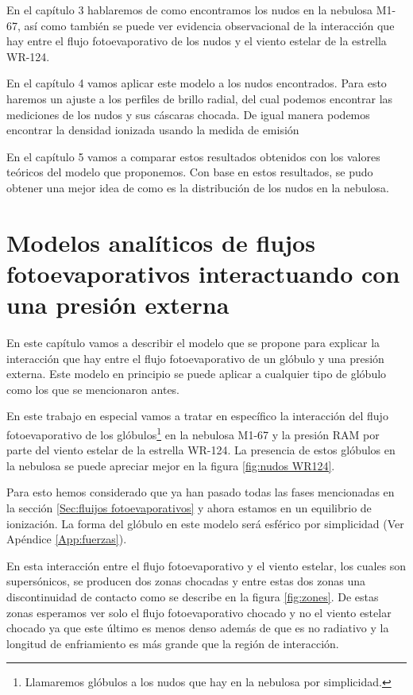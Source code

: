\documentclass{book}
\begin{document}
En el capítulo 3 hablaremos de como encontramos los nudos en la nebulosa M1-67, así como también se puede ver evidencia observacional de la interacción que hay entre el flujo fotoevaporativo de los nudos y el viento estelar de la estrella WR-124.

En el capítulo 4 vamos aplicar este modelo a los nudos encontrados. Para esto haremos un ajuste a los perfiles de brillo radial, del cual podemos encontrar las mediciones de los nudos y sus cáscaras chocada. De igual manera podemos encontrar la densidad ionizada usando la medida de emisión

En el capítulo 5 vamos a comparar estos resultados obtenidos con los valores teóricos del modelo que proponemos. Con base en estos resultados, se pudo obtener una mejor idea de como es la distribución de los nudos en la nebulosa.  

\chapter{Modelos analíticos de flujos fotoevaporativos interactuando con una presión externa}
\label{Chapter : Modelo}

En este capítulo vamos a describir el modelo que se propone para explicar la interacción que hay entre el flujo fotoevaporativo de un glóbulo y una presión externa. Este modelo en principio se puede aplicar a cualquier tipo de glóbulo como los que se mencionaron antes. 

En este trabajo en especial vamos a tratar en específico la interacción del flujo fotoevaporativo de los glóbulos\footnote{Llamaremos glóbulos a los nudos que hay en la nebulosa por simplicidad.} en la nebulosa M1-67 y la presión RAM por parte del viento estelar de la estrella WR-124. La presencia de estos glóbulos en la nebulosa se puede apreciar mejor en la figura \ref{fig:nudos WR124}.

Para esto hemos considerado que ya han pasado todas las fases mencionadas en la sección \ref{Sec:fluijos fotoevaporativos} y ahora estamos en un equilibrio de ionización. La forma del glóbulo en este modelo será esférico por simplicidad (Ver Apéndice \ref{App:fuerzas}).

En esta interacción entre el flujo fotoevaporativo y el viento estelar, los cuales son supersónicos, se producen dos zonas chocadas y entre estas dos zonas una discontinuidad de contacto como se describe en la figura \ref{fig:zones}. De estas zonas esperamos ver solo el flujo fotoevaporativo chocado y no el viento estelar chocado ya que este último es menos denso además de que es no radiativo y la longitud de enfriamiento es más grande que la región de interacción.
\end{document}

